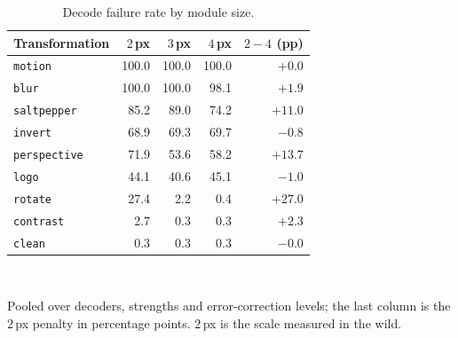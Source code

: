 \begin{table}[htbp]
\centering\small
\caption{Decode failure rate by module size.}
\label{tab:qr_scale}
\begin{tabular}{lrrrr}
\toprule
Transformation & $2$\,px & $3$\,px & $4$\,px & $2-4$ (pp) \\
\midrule
\texttt{motion} & 100.0 & 100.0 & 100.0 & $+0.0$ \\
\texttt{blur} & 100.0 & 100.0 & 98.1 & $+1.9$ \\
\texttt{saltpepper} & 85.2 & 89.0 & 74.2 & $+11.0$ \\
\texttt{invert} & 68.9 & 69.3 & 69.7 & $-0.8$ \\
\texttt{perspective} & 71.9 & 53.6 & 58.2 & $+13.7$ \\
\texttt{logo} & 44.1 & 40.6 & 45.1 & $-1.0$ \\
\texttt{rotate} & 27.4 & 2.2 & 0.4 & $+27.0$ \\
\texttt{contrast} & 2.7 & 0.3 & 0.3 & $+2.3$ \\
\texttt{clean} & 0.3 & 0.3 & 0.3 & $-0.0$ \\
\bottomrule
\end{tabular}
\\[4pt]
\begin{minipage}{0.82\linewidth}\footnotesize
Pooled over decoders, strengths and error-correction levels; the last column is the $2$\,px penalty
in percentage points. $2$\,px is the scale measured in the wild.
\end{minipage}
\end{table}
